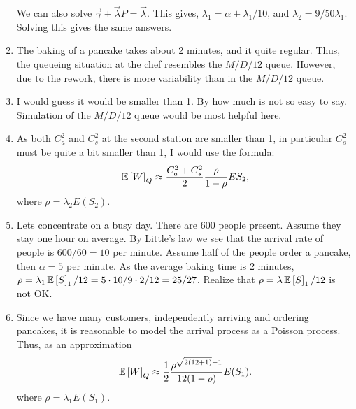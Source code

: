\begin{question}[use=false]
\begin{solution}
\begin{enumerate}
  We can also solve $\vec \gamma + \vec \lambda P = \vec \lambda$.
  This gives, $\lambda_1 = \alpha + \lambda_1/10$, and
  $\lambda_2 = 9/50 \lambda_1$. Solving this gives the same answers.
\item       The baking of a pancake takes about 2 minutes, and it quite
      regular. Thus, the queueing situation at the chef resembles the
      $M/D/12$ queue. However, due to the rework, there is more variability than in the $M/D/12$ queue. 
    \item       I would guess it would be smaller than 1. By how much is not so
      easy to say. Simulation of the $M/D/12$ queue would be most helpful here.
    \item       As both  $C_a^2$ and $C_s^2$ at the second station are smaller than 1, in particular $C_s^2$ must be quite a bit smaller than 1, I would use the formula:
\begin{equation*}
  \,\mathbb{E}\left[W\right]_Q \approx \frac{C_a^2 + C_s^2}2 \frac \rho{1-\rho} ES_2,
\end{equation*}
where $\rho=\lambda_2E(S_2)$.
\item       Lets concentrate on a busy day. There are 600 people
      present. Assume they stay one hour on average. By Little's law
      we see that the arrival rate of people is $600/60=10$ per
      minute. Assume half of the people order a pancake, then $\alpha=5$ per minute. As the average baking time is 2 minutes, $\rho = \lambda_1 \,\mathbb{E}\left[S\right]_1/12 = 5\cdot 10/9\cdot 2/12= 25/27$.
Realize that $\rho=\lambda\,\mathbb{E}\left[S\right]_1/12$ is not OK. 
\item Since we have many customers, independently arriving and ordering pancakes, it is reasonable to model the arrival process as a Poisson process. Thus, as an approximation
  \begin{equation*}
    \,\mathbb{E}\left[W\right]_Q \approx \frac12 \frac{\rho^{\sqrt{2(12+1)} - 1}}{12(1-\rho)} E(S_1).
  \end{equation*}
where $\rho=\lambda_1 E(S_1)$.
\end{enumerate}
\end{solution}
\end{question}


